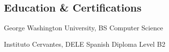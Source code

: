 \documentclass[line, letterpaper]{res}
\begin{document}
\address{+1 (412) 298-0536\\maco@mackenzie.morgan.name\\GitHub: maco}
\begin{resume}
	



%
%		
%		
		

	\section{Education \& Certifications}
        George Washington University, BS Computer Science

		Instituto Cervantes, DELE Spanish Diploma Level B2

\end{resume}
\end{document}
